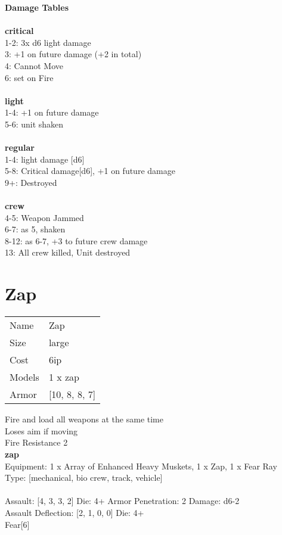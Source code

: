 {\bf Damage Tables} \\
\ \\ {\bf critical } \\
1-2: 3x d6 light damage \\
3: +1 on future damage (+2 in total) \\
4: Cannot Move \\
6: set on Fire \\
\ \\ {\bf light } \\
1-4: +1 on future damage \\
5-6: unit shaken \\
\ \\ {\bf regular } \\
1-4: light damage [d6] \\
5-8: Critical damage[d6], +1 on future damage \\
9+: Destroyed \\
\ \\ {\bf crew } \\
4-5: Weapon Jammed \\
6-7: as 5, shaken \\
8-12: as 6-7, +3 to future crew damage \\
13: All crew killed, Unit destroyed \\










\pagebreak\pagebreak

\section{ Zap }

\begin{tabular}{ll}
  Name & Zap \\
  Size & large\\
  Cost & 6ip\\
  Models & 1 x zap\\
  Armor & [10, 8, 8, 7]\\
\end{tabular}

\noindent Fire and load all weapons at the same time\\ 
Loses aim if moving\\ 
Fire Resistance 2\\ 


{\bf zap } \\
Equipment: 1 x Array of Enhanced Heavy Muskets, 1 x Zap, 1 x Fear Ray \\
Type: [mechanical, bio crew, track, vehicle] \\
\ \\
Assault: [4, 3, 3, 2] Die: 4+ Armor Penetration: 2 Damage: d6-2 \\
Assault Deflection: [2, 1, 0, 0] Die: 4+\\
\indent Fear[6]\\ 
 
